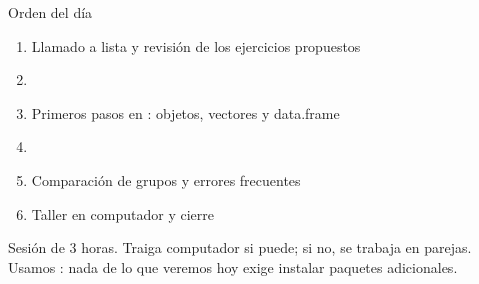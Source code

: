 \documentclass[aspectratio=169,10pt]{beamer}
\newcommand{\fx}[1]{{\ttfamily\color{uniAzul}#1}}
\begin{document}
\portada

\begin{frame}{Orden del día}
  \begin{enumerate}
    \item Llamado a lista y revisión de los ejercicios propuestos
    \item {}
    \item Primeros pasos en : objetos, vectores y \fx{data.frame}
    \item {}
    \item Comparación de grupos y errores frecuentes
    \item Taller en computador y cierre
  \end{enumerate}

  \vspace{0.25cm}
  {\footnotesize\color{uniGris} Sesión de 3 horas. Traiga computador si puede;
  si no, se trabaja en parejas. Usamos : nada de lo que
  veremos hoy exige instalar paquetes adicionales.}
\end{frame}
\end{document}
